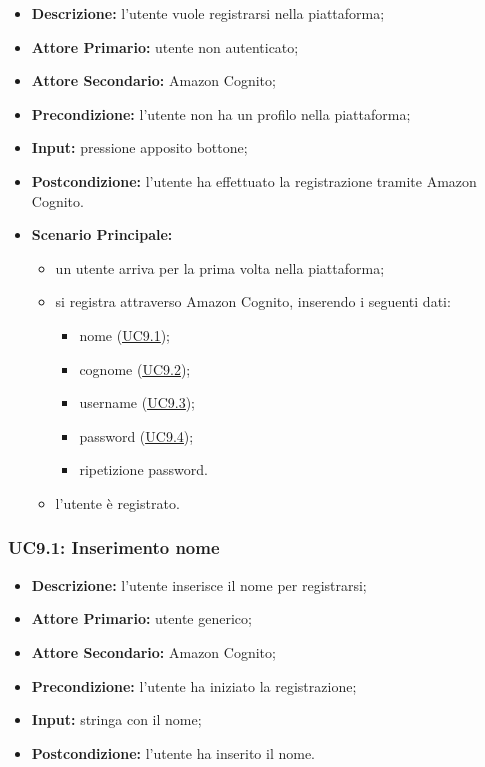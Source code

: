 \begin{itemize}
    \item \textbf{Descrizione:} l'utente vuole registrarsi nella piattaforma;
    \item \textbf{Attore Primario:} utente non autenticato;
    \item \textbf{Attore Secondario:} Amazon Cognito;
    \item \textbf{Precondizione:} l'utente non ha un profilo nella piattaforma;
    \item \textbf{Input:} pressione apposito bottone;
    \item \textbf{Postcondizione:} l'utente ha effettuato la registrazione tramite Amazon Cognito.
    \item \textbf{Scenario Principale:}
          \begin{itemize}
              \item un utente arriva per la prima volta nella piattaforma;
              \item si registra attraverso Amazon Cognito, inserendo i seguenti dati:
                    \begin{itemize}
                        \item nome (\hyperref[sec:UC9.1]{\underline{UC9.1}});
                        \item cognome (\hyperref[sec:UC9.2]{\underline{UC9.2}});
                        \item username (\hyperref[sec:UC9.3]{\underline{UC9.3}});
                        \item password (\hyperref[sec:UC9.4]{\underline{UC9.4}});
                        \item ripetizione password.
                    \end{itemize}
              \item l'utente è registrato.
          \end{itemize}
\end{itemize}

\subsubsection{UC9.1: Inserimento nome}
\label{sec:UC9.1}
\begin{itemize}
    \item \textbf{Descrizione:} l'utente inserisce il nome per registrarsi;
    \item \textbf{Attore Primario:} utente generico;
    \item \textbf{Attore Secondario:} Amazon Cognito;
    \item \textbf{Precondizione:} l'utente ha iniziato la registrazione;
    \item \textbf{Input:} stringa con il nome;
    \item \textbf{Postcondizione:} l'utente ha inserito il nome.
\end{itemize}

